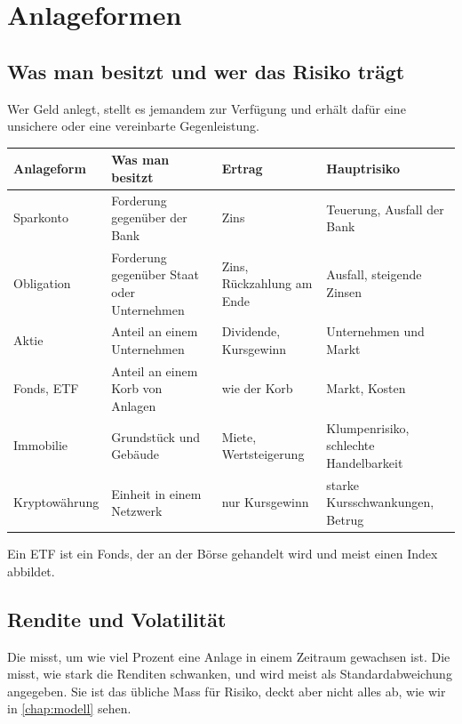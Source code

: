 \chapter{Anlageformen}\label{chap:anlageformen}



\section{Was man besitzt und wer das Risiko trägt}
Wer Geld anlegt, stellt es jemandem zur Verfügung und erhält dafür eine unsichere oder eine vereinbarte Gegenleistung.

\begin{center}
	\small
	\begin{tabular}{@{}p{}p{}p{}p{}@{}}
		\midrule
		\textbf{Anlageform} & \textbf{Was man besitzt} & \textbf{Ertrag} & \textbf{Hauptrisiko} \\
		\midrule
		Sparkonto & Forderung gegenüber der Bank & Zins & Teuerung, Ausfall der Bank \\
		Obligation & Forderung gegenüber Staat oder Unternehmen & Zins, Rückzahlung am Ende & Ausfall, steigende Zinsen \\
		Aktie & Anteil an einem Unternehmen & Dividende, Kursgewinn & Unternehmen und Markt \\
		Fonds, \acrshort{ETF} & Anteil an einem Korb von Anlagen & wie der Korb & Markt, Kosten \\
		Immobilie & Grundstück und Gebäude & Miete, Wertsteigerung & Klumpenrisiko, schlechte Handelbarkeit \\
		Kryptowährung & Einheit in einem Netzwerk & nur Kursgewinn & starke Kursschwankungen, Betrug \\
		\midrule
	\end{tabular}
\end{center}

Ein \gls{ETF} ist ein Fonds, der an der Börse gehandelt wird und meist einen Index abbildet.

\section{Rendite und Volatilität}
Die  misst, um wie viel Prozent eine Anlage in einem Zeitraum gewachsen ist. Die  misst, wie stark die Renditen schwanken, und wird meist als Standardabweichung angegeben. Sie ist das übliche Mass für Risiko, deckt aber nicht alles ab, wie wir in \cref{chap:modell} sehen.

